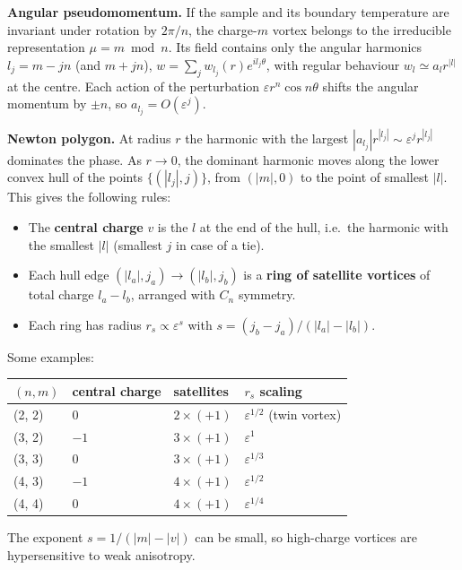 \textbf{Angular pseudomomentum.} If the sample and its boundary temperature are invariant under rotation by \(2\pi/n\), the charge-\(m\) vortex belongs to the irreducible representation \(\mu = m \bmod n\). Its field contains only the angular harmonics \(l_j = m - j n\) (and \(m + j n\)), \(w = \sum_j w_{l_j}(r) e^{i l_j \theta}\), with regular behaviour \(w_l \simeq a_l r^{|l|}\) at the centre. Each action of the perturbation \(\varepsilon r^n \cos n\theta\) shifts the angular momentum by \(\pm n\), so \(a_{l_j} = O(\varepsilon^j)\).

\textbf{Newton polygon.} At radius \(r\) the harmonic with the largest \(|a_{l_j}| r^{|l_j|} \sim \varepsilon^j r^{|l_j|}\) dominates the phase. As \(r \to 0\), the dominant harmonic moves along the lower convex hull of the points \(\{(|l_j|, j)\}\), from \((|m|, 0)\) to the point of smallest \(|l|\). This gives the following rules:

\begin{itemize}
\tightlist
\item
  The \textbf{central charge} \(v\) is the \(l\) at the end of the hull, i.e.~the harmonic with the smallest \(|l|\) (smallest \(j\) in case of a tie).
\item
  Each hull edge \((|l_a|, j_a) \to (|l_b|, j_b)\) is a \textbf{ring of satellite vortices} of total charge \(l_a - l_b\), arranged with \(C_n\) symmetry.
\item
  Each ring has radius \(r_s \propto \varepsilon^{s}\) with \(s = (j_b - j_a)/(|l_a| - |l_b|)\).
\end{itemize}

Some examples:

\begin{longtable}[]{@{}llll@{}}
\toprule\noalign{}
\((n, m)\) & central charge & satellites & \(r_s\) scaling \\
\midrule\noalign{}
\endhead
\bottomrule\noalign{}
\endlastfoot
(2, 2) & \(0\) & \(2 \times (+1)\) & \(\varepsilon^{1/2}\) (twin vortex) \\
(3, 2) & \(-1\) & \(3 \times (+1)\) & \(\varepsilon^{1}\) \\
(3, 3) & \(0\) & \(3 \times (+1)\) & \(\varepsilon^{1/3}\) \\
(4, 3) & \(-1\) & \(4 \times (+1)\) & \(\varepsilon^{1/2}\) \\
(4, 4) & \(0\) & \(4 \times (+1)\) & \(\varepsilon^{1/4}\) \\
\end{longtable}

The exponent \(s = 1/(|m| - |v|)\) can be small, so high-charge vortices are hypersensitive to weak anisotropy.

